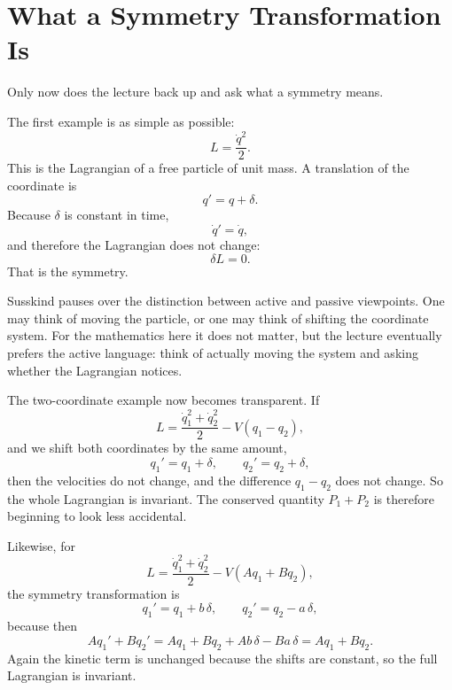 \section{What a Symmetry Transformation Is}

Only now does the lecture back up and ask what a symmetry means.

The first example is as simple as possible:
\begin{equation}
L=\frac{\dot q^2}{2}.
\end{equation}
This is the Lagrangian of a free particle of unit mass. A translation of the coordinate is
\begin{equation}
q' = q+\delta.
\end{equation}
Because \(\delta\) is constant in time,
\begin{equation}
\dot q'=\dot q,
\end{equation}
and therefore the Lagrangian does not change:
\begin{equation}
\delta L=0.
\end{equation}
That is the symmetry.

Susskind pauses over the distinction between active and passive viewpoints. One may think of moving the particle, or one may think of shifting the coordinate system. For the mathematics here it does not matter, but the lecture eventually prefers the active language: think of actually moving the system and asking whether the Lagrangian notices.

The two-coordinate example now becomes transparent. If
\begin{equation}
L=\frac{\dot q_1^2+\dot q_2^2}{2}-V(q_1-q_2),
\end{equation}
and we shift both coordinates by the same amount,
\begin{equation}
q_1' = q_1+\delta,
\qquad
q_2' = q_2+\delta,
\end{equation}
then the velocities do not change, and the difference \(q_1-q_2\) does not change. So the whole Lagrangian is invariant. The conserved quantity \(P_1+P_2\) is therefore beginning to look less accidental.

Likewise, for
\begin{equation}
L=\frac{\dot q_1^2+\dot q_2^2}{2}-V(Aq_1+Bq_2),
\end{equation}
the symmetry transformation is
\begin{equation}
q_1' = q_1+b\,\delta,
\qquad
q_2' = q_2-a\,\delta,
\end{equation}
because then
\begin{equation}
Aq_1'+Bq_2'
=
Aq_1+Bq_2+Ab\,\delta-Ba\,\delta
=
Aq_1+Bq_2.
\end{equation}
Again the kinetic term is unchanged because the shifts are constant, so the full Lagrangian is invariant.

